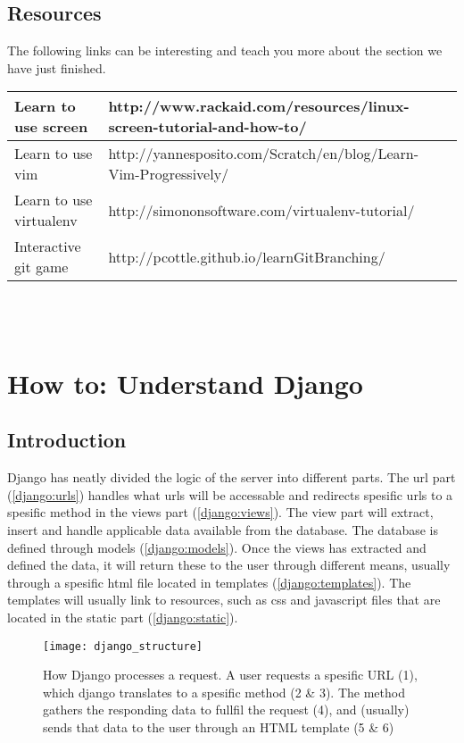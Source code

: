 \documentclass{report}
\begin{document}
\subsection{Resources}
The following links can be interesting and teach you more about the section we have just finished. \\

\begin{tabular}{| l | p{9cm} |} \hline
Learn to use screen & http://www.rackaid.com/resources/linux-screen-tutorial-and-how-to/ \\ \hline
Learn to use vim & http://yannesposito.com/Scratch/en/blog/Learn-Vim-Progressively/ \\ \hline
Learn to use virtualenv & http://simononsoftware.com/virtualenv-tutorial/ \\ \hline
Interactive git game & http://pcottle.github.io/learnGitBranching/ \\ \hline
\end{tabular}\\ \\

\newpage
\section{How to: Understand Django} \label{sec:understand_django}
\subsection{Introduction}
Django has neatly divided the logic of the server into different parts. The url part (\ref{django:urls}) handles what urls will be accessable and redirects spesific urls to a spesific method in the views part (\ref{django:views}). The view part will extract, insert and handle applicable data available from the database. The database is defined through models (\ref{django:models}). Once the views has extracted and defined the data, it will return these to the user through different means, usually through a spesific html file located in templates (\ref{django:templates}). The templates will usually link to resources, such as css and javascript files that are located in the static part (\ref{django:static}). 

\begin{figure}
    \centering
    \texttt{[image: django\_structure]}
    \caption{How Django processes a request. A user requests a spesific URL (1), which django translates to a spesific method (2 \& 3). The method gathers the responding data to fullfil the request (4), and (usually) sends that data to the user through an HTML template (5 \& 6) \label{fig:django_struct}}
\end{figure}
\end{document}
